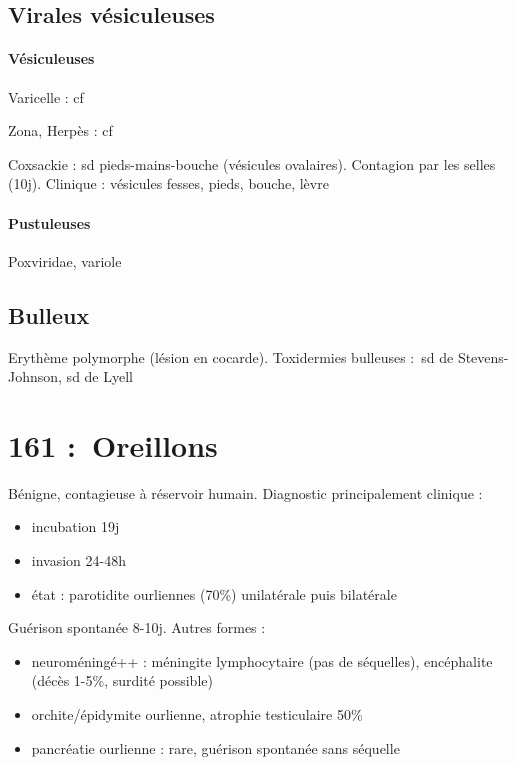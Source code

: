 \subsection{Virales vésiculeuses}

\paragraph{Vésiculeuses}

Varicelle : cf ~

Zona, Herpès : cf~

Coxsackie : sd pieds-mains-bouche (vésicules ovalaires). Contagion par
les selles (10j). Clinique : vésicules fesses, pieds, bouche, lèvre

\paragraph{Pustuleuses} Poxviridae, variole

\subsection{Bulleux} Erythème polymorphe (lésion en cocarde). Toxidermies bulleuses :~sd de
Stevens-Johnson, sd de Lyell

\section{161 :~Oreillons}

Bénigne, contagieuse à réservoir humain. Diagnostic principalement
clinique :

\begin{itemize}
\item incubation 19j
\item invasion 24-48h
\item état : parotidite ourliennes (70\%) unilatérale puis bilatérale
\end{itemize}

Guérison spontanée 8-10j. Autres formes :

\begin{itemize}
\tightlist
\item
  neuroméningé++ : méningite lymphocytaire (pas de séquelles),
  encéphalite (décès 1-5\%, surdité possible)
\item
  orchite/épidymite ourlienne, atrophie testiculaire 50\%
\item
  pancréatie ourlienne : rare, guérison spontanée sans séquelle
\end{itemize}

